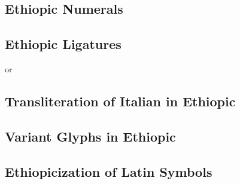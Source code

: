 \subsection*{Ethiopic Numerals}

\subsection*{Ethiopic Ligatures}

{\yeG}{\mYaG}{\gG}{\zeG}{\wG}
{\yeG}{\mYaG}{\qeG}{\bG}{\leG}{\tG}
{\leG}{\mYaG}{\geG}{\NuG}
{\yeG}{\mYaG}{\xG}{\keG}{\giG}{\kG}{\ruG} or {\yeG}{\mYaG}{\xG}{\keG}{\reG}{\kG}{\ruG}
{\yeG}{\mYaG}{\mG}{\tG}{\tG}{\nG}
{\yeG}{\mYaG}{\rG}{\qG}{\leG}{\tG}

\subsection*{Transliteration of Italian in Ethiopic}

\subsection*{Variant Glyphs in Ethiopic}

\subsection*{Ethiopicization of Latin Symbols}












